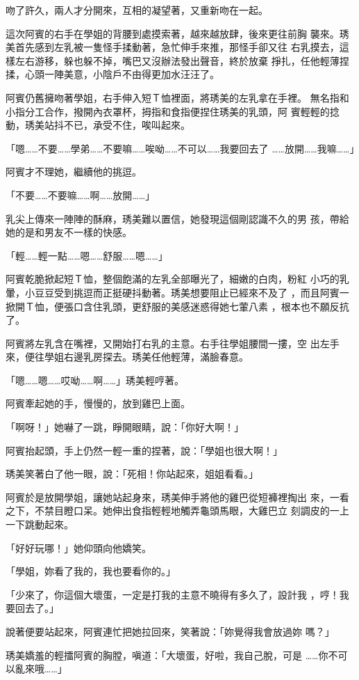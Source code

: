 吻了許久，兩人才分開來，互相的凝望著，又重新吻在一起。

這次阿賓的右手在學姐的背腰到處摸索著，越來越放肆，後來更往前胸
襲來。琇美首先感到左乳被一隻怪手揉動著，急忙伸手來推，那怪手卻又往
右乳摸去，這樣左右游移，躲也躲不掉，嘴巴又沒辦法發出聲音，終於放棄
掙扎，任他輕薄捏揉，心頭一陣美意，小陰戶不由得更加水汪汪了。

阿賓仍舊擁吻著學姐，右手伸入短Ｔ恤裡面，將琇美的左乳拿在手裡。
無名指和小指分工合作，撥開內衣罩杯，拇指和食指便捏住琇美的乳頭，阿
賓輕輕的捻動，琇美站抖不已，承受不住，唉叫起來。

「嗯……不要……學弟……不要嘛……唉呦……不可以……我要回去了
……放開……我嘛……」

阿賓才不理她，繼續他的挑逗。

「不要……不要嘛……啊……放開……」

乳尖上傳來一陣陣的酥麻，琇美難以置信，她發現這個剛認識不久的男
孩，帶給她的是和男友不一樣的快感。

「輕……輕一點……嗯……舒服……嗯……」

阿賓乾脆掀起短Ｔ恤，整個飽滿的左乳全部曝光了，細嫩的白肉，粉紅
小巧的乳暈，小豆豆受到挑逗而正挺硬抖動著。琇美想要阻止已經來不及了
，而且阿賓一掀開Ｔ恤，便張口含住乳頭，更舒服的美感迷惑得她七葷八素
，根本也不願反抗了。

阿賓將左乳含在嘴裡，又開始打右乳的主意。右手往學姐腰間一摟，空
出左手來，便往學姐右邊乳房探去。琇美任他輕薄，滿臉春意。

「嗯……嗯……哎呦……啊……」琇美輕哼著。

阿賓牽起她的手，慢慢的，放到雞巴上面。

「啊呀！」她嚇了一跳，睜開眼睛，說：「你好大啊！」

阿賓抬起頭，手上仍然一輕一重的捏著，說：「學姐也很大啊！」

琇美笑著白了他一眼，說：「死相！你站起來，姐姐看看。」

阿賓於是放開學姐，讓她站起身來，琇美伸手將他的雞巴從短褲裡掏出
來，一看之下，不禁目瞪口呆。她伸出食指輕輕地觸弄龜頭馬眼，大雞巴立
刻調皮的一上一下跳動起來。

「好好玩哪！」她仰頭向他嬌笑。

「學姐，妳看了我的，我也要看你的。」

「少來了，你這個大壞蛋，一定是打我的主意不曉得有多久了，設計我
，哼！我要回去了。」

說著便要站起來，阿賓連忙把她拉回來，笑著說：「妳覺得我會放過妳
嗎？」

琇美嬌羞的輕擂阿賓的胸膛，嗔道：「大壞蛋，好啦，我自己脫，可是
……你不可以亂來哦……」

